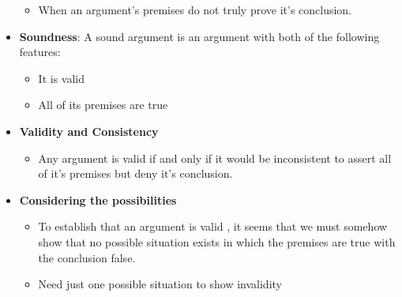 \documentclass{report}
\begin{document}
\begin{itemize}
\begin{itemize}
				\item When an argument's premises do not truly prove it's conclusion.
			\end{itemize}
			\item \textbf{Soundness}: A sound argument is an argument with both of the following features:
			\begin{itemize}\addtolength{\leftskip}{4em}
				\item It is valid
				\item All of its premises are true
			\end{itemize}
			\item \textbf{Validity and Consistency}
			\begin{itemize}\addtolength{\leftskip}{4em}
				\item Any argument is valid if and only if it would be inconsistent to assert all of it's premises but deny it's conclusion.
			\end{itemize}
			\item \textbf{Considering the possibilities}
			\begin{itemize}\addtolength{\leftskip}{4em}
				\item To establish that an argument is valid , it seems that we must somehow show that no possible situation exists in which the premises are true with the conclusion false.
				\item Need just one possible situation to show invalidity
			\end{itemize}
		\end{itemize}
		
\end{document}
